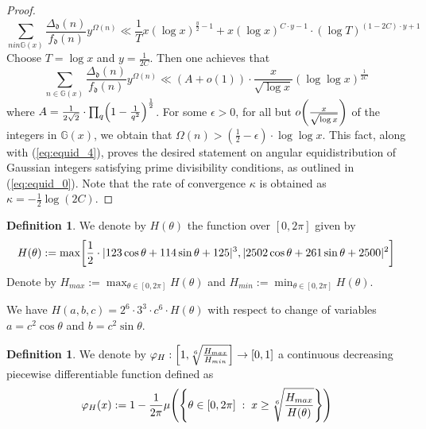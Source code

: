 \documentclass[12pt]{amsart}
\numberwithin{equation}{section} %
\theoremstyle{definition} \newtheorem{definition}[counter]{Definition}
\theoremstyle{remark} \newtheorem{nonexam}[counter]{Non-example}
\let\originalleft\left \let\originalright\right
\renewcommand{\left}{\mathopen{}\mathclose\bgroup\originalleft}
\renewcommand{\right}{\aftergroup\egroup\originalright}
\begin{document}
\begin{proof}
    \begin{equation} \label{eq:equid_4}
        \sum_{n in \mathbb{G}(x)} \frac{\Delta_\mathfrak{d}(n)}{f_\mathfrak{d}(n)}y^{\Omega(n)} \ll \frac{1}{T} x (\log x)^{\frac{y}{2} - 1} + x (\log x)^{C \cdot y - 1} \cdot (\log T)^{(1 - 2C) \cdot y + 1}
    \end{equation}
    Choose $T = \log x$ and $y = \frac{1}{2C}$. Then one achieves that
    \begin{equation}
        \sum_{n \in \mathbb{G}(x)} \frac{\Delta_\mathfrak{d}(n)}{f_\mathfrak{d}(n)}y^{\Omega(n)} \ll (A + o(1)) \cdot \frac{x}{\sqrt{\log x}} (\log \log x)^{\frac{1}{2C}}
    \end{equation}
    where $A = \frac{1}{2\sqrt{2}} \cdot \prod_{q} \left( 1 - \frac{1}{q^2} \right)^{\frac{1}{2}}$. For some $\epsilon > 0$, for all but $o \left( \frac{x}{\sqrt{\log x}} \right)$ of the integers in $\mathbb{G}(x)$, we obtain that $\Omega(n) > (\frac{1}{2} - \epsilon) \cdot \log \log x$. This fact, along with (\ref{eq:equid_4}), proves the desired statement on angular equidistribution of Gaussian integers satisfying prime divisibility conditions, as outlined in (\ref{eq:equid_0}). Note that the rate of convergence $\kappa$ is obtained as $\kappa = -\frac{1}{2}\log(2C)$.
\end{proof}

\begin{definition} \label{def:H-theta}
    We denote by $H(\theta)$ the function over $[0,2\pi]$ given by
    \begin{equation}
        H(\theta) := \max\left[ \frac{1}{2} \cdot |123 \cos \theta + 114 \sin \theta + 125|^3, |2502 \cos \theta + 261 \sin \theta + 2500|^2 \right]
    \end{equation}
    Denote by $H_{max} := \max_{\theta \in [0,2\pi]} H(\theta)$ and $H_{min} := \min_{\theta \in [0,2\pi]} H(\theta)$.
\end{definition}
We have $H(a,b,c) = 2^6 \cdot 3^3 \cdot c^6 \cdot H(\theta)$ with respect to change of variables $a = c^2 \cos \theta$ and $b = c^2 \sin \theta$.

\begin{definition}
    We denote by $\varphi_{H}: \left[1,\sqrt[6]{\frac{H_{max}}{H_{min}}} \right] \to [0,1]$ a continuous decreasing piecewise differentiable function defined as
    \begin{equation}
        \varphi_H(x) := 1 - \frac{1}{2\pi} \mu \left( \left\{ \theta \in [0,2\pi] \; : \; x \geq \sqrt[6]{\frac{H_{max}}{H(\theta)}} \right\} \right)
    \end{equation}
\end{definition}
\end{document}
